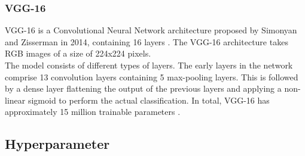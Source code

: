 \documentclass[sn-mathphys,Numbered]{sn-jnl}%
\theoremstyle{thmstyleone}%
\theoremstyle{thmstyletwo}%
\theoremstyle{thmstylethree}%
\begin{document}
\subsubsection{VGG-16}\label{VGG-16}
VGG-16 is a Convolutional Neural Network architecture proposed by Simonyan and Zisserman in 2014, containing 16 layers \cite{Alzubaidi_2021}.
The VGG-16 architecture takes RGB images of a size of 224x224 pixels.\\
The model consists of different types of layers. The early layers in the network comprise 13 convolution layers containing 5 max-pooling layers.
This is followed by a dense layer flattening the output of the previous layers and applying a non-linear sigmoid to perform the actual classification. In total, VGG-16 has approximately 15 million trainable parameters \cite{Rahdika_2020}.

\subsection{Hyperparameter}\label{Hyperparameter}
\end{document}
